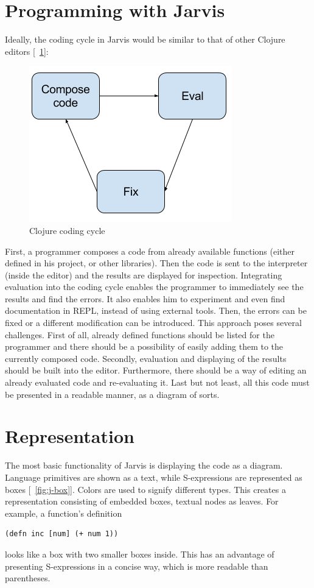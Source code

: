 \documentclass[english,mgr,shortabstract]{iithesis}
\newcommand*{\figref}[1]{[\textbf{\figurename}~\ref{#1}]}
\begin{document}
\section{Programming with Jarvis}
Ideally, the coding cycle in Jarvis would be similar to that of other Clojure
editors \figref{fig:clojure-coding}:

\begin{figure}[hbt]
  \centering
  \includegraphics[scale=0.5]{img/Programming.png}
  \caption{Clojure coding cycle}
\label{fig:clojure-coding}
\end{figure}

First, a programmer composes a code from already available functions (either
defined in his project, or other libraries).
Then the code is sent to the interpreter (inside the editor) and the results are
displayed for inspection.
Integrating evaluation into the coding cycle enables the programmer to
immediately see the results and find the errors.
It also enables him to experiment and even find documentation in REPL, instead
of using external tools.
Then, the errors can be fixed or a different modification can be introduced.
This approach poses several challenges.
First of all, already defined functions should be listed for the programmer and
there should be a possibility of easily adding them to the currently composed
code.
Secondly, evaluation and displaying of the results should be built into the
editor.
Furthermore, there should be a way of editing an already evaluated code and
re-evaluating it.
Last but not least, all this code must be presented in a readable manner, as a
diagram of sorts.

\section{Representation}
The most basic functionality of Jarvis is displaying the code as a diagram.
Language primitives are shown as a text, while S-expressions are
represented as boxes \figref{fig:j-box}.
Colors are used to signify different types.
This creates a representation consisting of embedded boxes, textual nodes as
leaves.
For example, a function’s definition
\begin{lstlisting}
(defn inc [num] (+ num 1))
\end{lstlisting}
looks like a box
with two smaller boxes inside.
This has an advantage of presenting S-expressions in a concise way, which is
more readable than parentheses.
\end{document}
